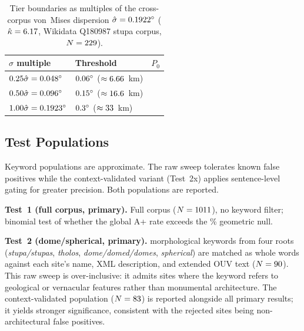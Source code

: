 \begin{table}[h]
\centering\small
\caption{Tier boundaries as multiples of the cross-corpus von~Mises dispersion
$\hat{\sigma} = \vmSigmaDegStupa{}\textdegree{}$ ($\hat{\kappa} = 6.17{}$,
Wikidata Q180987 stupa corpus, $N = 229{}$).}
\label{tab:vonmises_tiers}
\begin{tabular}{lll}
\hline
$\hat{\sigma}$ multiple & Threshold & $P_0$ \\
\hline
$0.25\hat{\sigma} = \vmHalfSigmaDegStupa{}\textdegree{}$ & $\AppThreshDeg{}\textdegree{}$ ($\approx 6.66{}$~km) & \NullRateApp{} \\
$0.50\hat{\sigma} = \vmOneSigmaDegStupa{}\textdegree{}$  & $\ApThreshDeg{}\textdegree{}$  ($\approx 16.6{}$~km)  & \NullRateAp{}  \\
$1.00\hat{\sigma} = \vmTwoSigmaDegStupa{}\textdegree{}$  & $\ATierThreshDeg{}\textdegree{}$ ($\approx 33{}$~km) & \NullRateA{} \\
\hline
\end{tabular}
\end{table}

\subsection{Test Populations}
\label{sec:test_populations}

Keyword populations are approximate. The raw sweep tolerates known
false positives while the context-validated variant (Test~2x) applies
sentence-level gating for greater precision.
Both populations are reported.

\textbf{Test~1 (full corpus, primary).}
Full corpus ($N = 1011$), no keyword filter; binomial test of
whether the global A+ rate exceeds the \NullRateApPct{}\% geometric null.

\textbf{Test~2 (dome/spherical, primary).}
\NcircKeywords{} morphological keywords from four roots
(\textit{stupa/stupas}, \textit{tholos}, \textit{dome/domed/domes},
\textit{spherical}) are matched as whole words against each site's
name, XML description, and extended OUV text ($N = 90$).
This raw sweep is over-inclusive: it admits sites where the keyword
refers to geological or vernacular features rather than monumental
architecture. The context-validated population ($N = 83$)
is reported alongside all primary results; it yields stronger
significance, consistent with the rejected sites being
non-architectural false positives.

